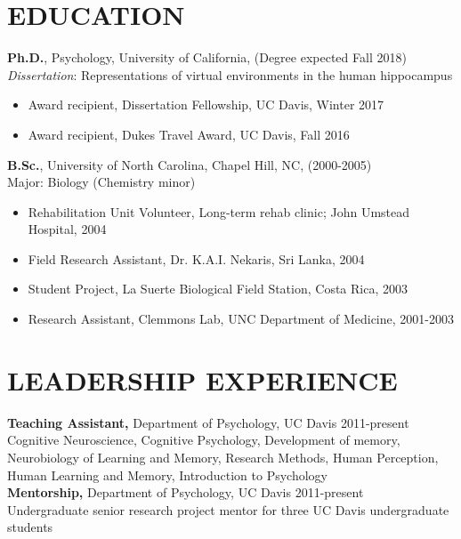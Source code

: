 \documentclass[line,margin,10pt]{res}
\begin{document}
\begin{resume}
\section{EDUCATION} 
\textbf{Ph.D.}, Psychology, University of California, (Degree expected Fall 2018)\\
\emph{Dissertation}: Representations of virtual environments in the human hippocampus\\
\begin{itemize} \itemsep -2pt
\item Award recipient, Dissertation Fellowship, UC Davis, Winter 2017
\item	Award recipient, Dukes Travel Award, UC Davis, Fall 2016
\end{itemize}

\textbf{B.Sc.}, University of North Carolina, Chapel Hill, NC, (2000-2005)\\
Major: Biology (Chemistry minor)\\
\begin{itemize} \itemsep -2pt
\item	Rehabilitation Unit Volunteer, Long-term rehab clinic; John Umstead Hospital, 2004
\item	Field Research Assistant, Dr. K.A.I. Nekaris, Sri Lanka, 2004
\item	Student Project, La Suerte Biological Field Station, Costa Rica, 2003
\item	Research Assistant, Clemmons Lab, UNC Department of Medicine, 2001-2003
\end{itemize}								

\section{LEADERSHIP EXPERIENCE}
 \textbf{Teaching Assistant,} Department of Psychology, UC Davis \hfill 2011-present \\
  Cognitive Neuroscience, Cognitive Psychology, Development of memory, Neurobiology of Learning and Memory, Research Methods, Human Perception, Human Learning and Memory, Introduction to Psychology\\
\textbf{Mentorship,} Department of Psychology, UC Davis \hfill 2011-present \\
Undergraduate senior research project mentor for three UC Davis undergraduate students\\


\end{resume}
\end{document}
